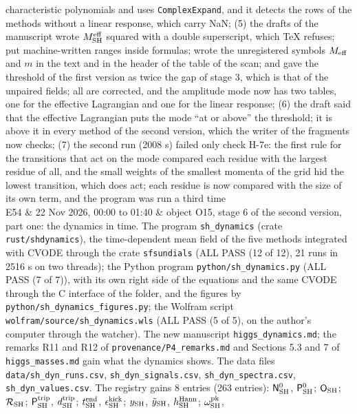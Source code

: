 \documentclass[
  10pt,
]{article}
\begin{document}
\begin{longtable}[]
characteristic polynomials and uses \texttt{ComplexExpand}, and it
detects the rows of the methods without a linear response, which carry
NaN; (5) the drafts of the manuscript wrote \(M^{\rm eff}_{\rm SH}\)
squared with a double superscript, which TeX refuses; put
machine-written ranges inside formulas; wrote the unregistered symbols
\(M_{\rm eff}\) and \(m\) in the text and in the header of the table of
the scan; and gave the threshold of the first version as twice the gap
of stage 3, which is that of the unpaired fields; all are corrected, and
the amplitude mode now has two tables, one for the effective Lagrangian
and one for the linear response; (6) the draft said that the effective
Lagrangian puts the mode ``at or above'' the threshold; it is above it
in every method of the second version, which the writer of the fragments
now checks; (7) the second run (2008 s) failed only check H-7e: the
first rule for the transitions that act on the mode compared each
residue with the largest residue of all, and the small weights of the
smallest momenta of the grid hid the lowest transition, which does act;
each residue is now compared with the size of its own term, and the
program was run a third time \\
E54 & 22 Nov 2026, 00:00 to 01:40 & object O15, stage 6 of the second
version, part one: the dynamics in time. The program
\texttt{sh\_dynamics} (crate \texttt{rust/shdynamics}), the
time-dependent mean field of the five methods integrated with CVODE
through the crate \texttt{sfsundials} (ALL PASS (12 of 12), 21 runs in
2516 s on two threads); the Python program
\texttt{python/sh\_dynamics.py} (ALL PASS (7 of 7)), with its own right
side of the equations and the same CVODE through the C interface of the
folder, and the figures by \texttt{python/sh\_dynamics\_figures.py}; the
Wolfram script \texttt{wolfram/source/sh\_dynamics.wls} (ALL PASS (5 of
5), on the author's computer through the watcher). The new manuscript
\texttt{higgs\_dynamics.md}; the remarks R11 and R12 of
\texttt{provenance/P4\_remarks.md} and Sections 5.3 and 7 of
\texttt{higgs\_masses.md} gain what the dynamics shows. The data files
\texttt{data/sh\_dyn\_runs.csv}, \texttt{sh\_dyn\_signals.csv},
\texttt{sh\_dyn\_spectra.csv}, \texttt{sh\_dyn\_values.csv}. The
registry gains 8 entries (263 entries): \(\mathsf N^0_{\rm SH}\),
\(\mathsf P^0_{\rm SH}\); \(\mathsf O_{\rm SH}\);
\(\mathcal R_{\rm SH}\); \(\mathsf P^{\rm trip}_{\rm SH}\),
\(d^{\rm trip}_{\rm SH}\); \(t^{\rm end}_{\rm SH}\),
\(\epsilon^{\rm kick}_{\rm SH}\); \(y_{\rm SH}\), \(\tilde y_{\rm SH}\),
\(h^{\rm Hann}_{\rm SH}\); \(\omega^{\rm pk}_{\rm SH}\),

\end{longtable}
\end{document}
